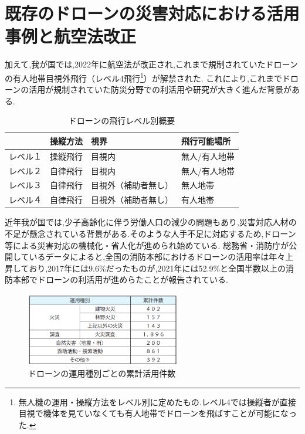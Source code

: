\section{既存のドローンの災害対応における活用事例と航空法改正}
加えて,我が国では,2022年に航空法が改正され,これまで規制されていたドローンの有人地帯目視外飛行（レベル4飛行\footnote{無人機の運用・操縦方法をレベル別に定めたもの.レベル4では操縦者が直接目視で機体を見ていなくても有人地帯でドローンを飛ばすことが可能になった.}）が解禁された.
これにより,これまでドローンの活用が規制されていた防災分野での利活用や研究が大きく進んだ背景がある.\par 
\begin{table}[H]
  \centering
  \begin{tabular}{|l|lll|}
  \hline
       & 操縦方法 & 視界         & 飛行可能場所  \\ \hline
  レベル１ & 操縦飛行 & 目視内        & 無人/有人地帯 \\ \hline
  レベル２ & 自律飛行 & 目視内        & 無人/有人地帯 \\ \hline
  レベル３ & 自律飛行 & 目視外（補助者無し） & 無人地帯    \\ \hline
  レベル４ & 自律飛行 & 目視外（補助者無し） & 有人地帯    \\ \hline
  \end{tabular}
  \caption{ドローンの飛行レベル別概要}
\end{table}
近年我が国では,少子高齢化に伴う労働人口の減少の問題もあり,災害対応人材の不足が懸念されている背景がある.そのような人手不足に対応するため,ドローン等による災害対応の機械化・省人化が進められ始めている.
総務省・消防庁が公開しているデータ\cite{soumusho-01}によると,全国の消防本部におけるドローンの活用率は年々上昇しており,2017年には9.6\%だったものが,2021年には52.9\%と全国半数以上の消防本部でドローンの利活用が進めらたことが報告されている.
\begin{figure}[H] 
  \centering 
  \includegraphics[width=0.6\textwidth]{Figures/2024-11-28 215911.png}
  \caption{ドローンの運用種別ごとの累計活用件数} 
  \label{fig:01} 
\end{figure}



